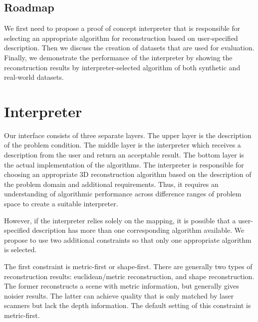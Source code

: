 \subsection{Roadmap}
We first need to propose a proof of concept interpreter that is responsible for selecting an appropriate algorithm for reconstruction based on user-specified description. Then we discuss the creation of datasets that are used for evaluation. Finally, we demonstrate the performance of the interpreter by showing the reconstruction results by interpreter-selected algorithm of both synthetic and real-world datasets.




\section{Interpreter}
\label{sec:interp}
Our interface consists of three separate layers. The upper layer is the description of the problem condition. The middle layer is the interpreter which receives a description from the user and return an acceptable result. The bottom layer is the actual implementation of the algorithms. The interpreter is responsible for choosing an appropriate 3D reconstruction algorithm based on the description of the problem domain and additional requirements. Thus, it requires an understanding of algorithmic performance across difference ranges of problem space to create a suitable interpreter.

However, if the interpreter relies solely on the mapping, it is possible that a user-specified description has more than one corresponding algorithm available. We propose to use two additional constraints so that only one appropriate algorithm is selected.

The first constraint is metric-first or shape-first. There are generally two types of reconstruction results: euclidean/metric reconstruction, and shape reconstruction. The former reconstructs a scene with metric information, but generally gives noisier results. The latter can achieve quality that is only matched by laser scanners but lack the depth information. The default setting of this constraint is metric-first.

